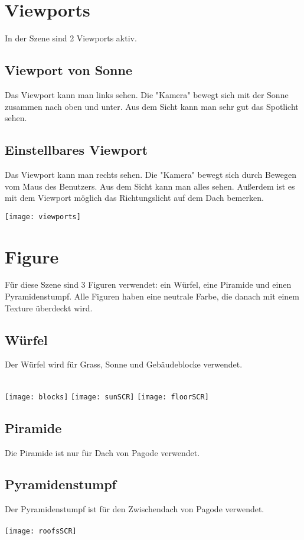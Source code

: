 \documentclass[12pt]{article}
\begin{document}
\section{Viewports}
In der Szene sind 2 Viewports aktiv.
\bigbreak
\subsection{Viewport von Sonne}
Das Viewport kann man links sehen. Die "Kamera" bewegt sich mit der Sonne zusammen nach oben und unter. Aus dem Sicht kann man sehr gut das Spotlicht sehen. 

\subsection{Einstellbares Viewport}
Das Viewport kann man rechts sehen. Die "Kamera" bewegt sich durch Bewegen vom Maus des Benutzers. Aus dem Sicht kann man alles sehen. Außerdem ist es mit dem Viewport möglich das Richtungslicht auf dem Dach bemerken. 

\begin{center}
\texttt{[image: viewports]}
\end{center}

\pagebreak

\section{Figure}
Für diese Szene sind 3 Figuren verwendet: ein Würfel, eine Piramide und einen Pyramidenstumpf. Alle Figuren haben eine neutrale Farbe, die danach mit einem Texture überdeckt wird. \\
\subsection{Würfel}
Der Würfel wird für Grass, Sonne und Gebäudeblocke verwendet. \\ \\
\begin{center}
\texttt{[image: blocks]}
\texttt{[image: sunSCR]}
\texttt{[image: floorSCR]}
\end{center}
\subsection{Piramide}
Die Piramide ist nur für Dach von Pagode verwendet.
\subsection{Pyramidenstumpf}
Der Pyramidenstumpf ist für den Zwischendach von Pagode verwendet. \\\\
\texttt{[image: roofsSCR]}
\end{document}
